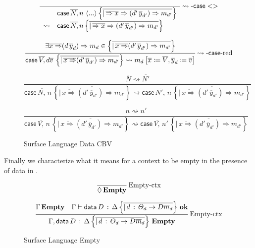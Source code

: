 \begin{figure}
\[
\frac{\,}{
  \begin{array}{rl}
   & \mathsf{case}\,\overline{N,}\,n\,\left\langle ...\right\rangle \left\{ \overline{|\,\overline{\Rightarrow x}\Rightarrow(d'\,\overline{y}_{d'})\Rightarrow m_{d'}}\right\} \\
   \rightsquigarrow & \mathsf{case}\,\overline{N,}\,n\left\{ \overline{|\,\overline{\Rightarrow x}\Rightarrow(d'\,\overline{y}_{d'})\Rightarrow m_{d'}}\right\} 
  \end{array}
   }\operatorname{\rightsquigarrow-\mathsf{case}{}<>}
\]

\[
\frac{\exists\overline{x\Rightarrow}(d\,\overline{y}_{d})\Rightarrow m_{d}\in\left\{ \overline{|\,\overline{x\Rightarrow}(d'\,\overline{y}_{d'})\Rightarrow m_{d'}}\right\} }{\mathsf{case}\,\overline{V,}\,d\overline{v}\,\left\{ \overline{|\,\overline{x\Rightarrow}(d'\,\overline{y}_{d'})\Rightarrow m_{d'}}\right\} \rightsquigarrow m_{d}\left[\overline{x}\coloneqq\overline{V},\overline{y}_{d}\coloneqq\overline{v}\right]
}\operatorname{\rightsquigarrow-\mathsf{case}{}-red}
\]

\[
\frac{\overline{N}\rightsquigarrow\overline{N'}}{\mathsf{case}\,\overline{N,}\,n\,\left\{ \overline{|\,\overline{x\Rightarrow}(d'\,\overline{y}_{d'})\Rightarrow m_{d'}}\right\} \rightsquigarrow\mathsf{case}\,\overline{N',}\,n\,\left\{ \overline{|\,\overline{x\Rightarrow}(d'\,\overline{y}_{d'})\Rightarrow m_{d'}}\right\} }\,
\]

\[
\frac{n\rightsquigarrow n'}{\mathsf{case}\,\overline{V,}\,n\,\left\{ \overline{|\,\overline{x\Rightarrow}(d'\,\overline{y}_{d'})\Rightarrow m_{d'}}\right\} \rightsquigarrow\mathsf{case}\,\overline{V,}\,n'\,\left\{ \overline{|\,\overline{x\Rightarrow}(d'\,\overline{y}_{d'})\Rightarrow m_{d'}}\right\} }\,
\]

\caption{Surface Language Data CBV}
\label{fig:surface-data-cbv}
\end{figure}


Finally we characterize what it means for a context to be empty in the presence of data in .

\begin{figure}
\[
\frac{\ }{\lozenge\,\mathbf{Empty}}\rulename{Empty-ctx}
\]

\[
\frac{\Gamma\,\mathbf{Empty}\quad\Gamma\vdash\mathsf{data}\,D\,:\,\Delta\left\{ \overline{|\,d\,:\,\varTheta_{d}\rightarrow D\overline{m}_{d}}\right\} \,\mathbf{ok}}{\Gamma,\mathsf{data}\,D\,:\,\Delta\left\{ \overline{|\,d\,:\,\varTheta_{d}\rightarrow D\overline{m}_{d}}\right\} \,\mathbf{Empty}}\operatorname{Empty-ctx}
\]

\caption{Surface Language Empty}
\label{fig:surface-data-empty}
\end{figure}

